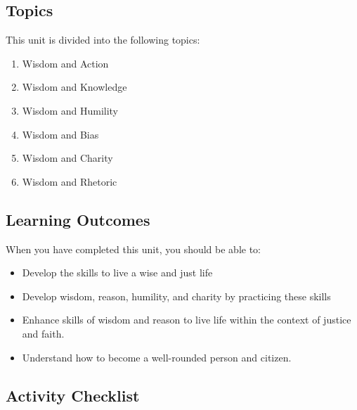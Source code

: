\documentclass[
]{book}
\providecommand{\tightlist}{%
  \setlength{\itemsep}{0pt}\setlength{\parskip}{0pt}}
\begin{document}
\hypertarget{topics}{%
\subsection*{Topics}\label{topics}}

This unit is divided into the following topics:

\begin{enumerate}
\def\labelenumi{\arabic{enumi}.}
\tightlist
\item
  Wisdom and Action\\
\item
  Wisdom and Knowledge\\
\item
  Wisdom and Humility\\
\item
  Wisdom and Bias\\
\item
  Wisdom and Charity\\
\item
  Wisdom and Rhetoric
\end{enumerate}

\hypertarget{learning-outcomes}{%
\subsection*{Learning Outcomes}\label{learning-outcomes}}

When you have completed this unit, you should be able to:

\begin{itemize}
\tightlist
\item
  Develop the skills to live a wise and just life\\
\item
  Develop wisdom, reason, humility, and charity by practicing these skills\\
\item
  Enhance skills of wisdom and reason to live life within the context of justice and faith.\\
\item
  Understand how to become a well-rounded person and citizen.
\end{itemize}

\hypertarget{activity-checklist}{%
\subsection*{Activity Checklist}\label{activity-checklist}}
\end{document}
